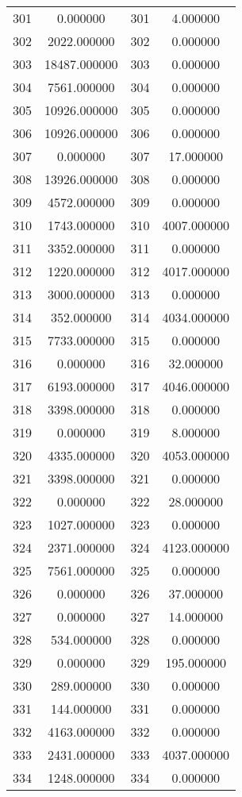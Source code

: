 \documentclass[12pt]{article}
\begin{document}
\begin{longtable}{@{}cccc@{}}
301 & 0.000000 & 301 & 4.000000 \\
302 & 2022.000000 & 302 & 0.000000 \\
303 & 18487.000000 & 303 & 0.000000 \\
304 & 7561.000000 & 304 & 0.000000 \\
305 & 10926.000000 & 305 & 0.000000 \\
306 & 10926.000000 & 306 & 0.000000 \\
307 & 0.000000 & 307 & 17.000000 \\
308 & 13926.000000 & 308 & 0.000000 \\
309 & 4572.000000 & 309 & 0.000000 \\
310 & 1743.000000 & 310 & 4007.000000 \\
311 & 3352.000000 & 311 & 0.000000 \\
312 & 1220.000000 & 312 & 4017.000000 \\
313 & 3000.000000 & 313 & 0.000000 \\
314 & 352.000000 & 314 & 4034.000000 \\
315 & 7733.000000 & 315 & 0.000000 \\
316 & 0.000000 & 316 & 32.000000 \\
317 & 6193.000000 & 317 & 4046.000000 \\
318 & 3398.000000 & 318 & 0.000000 \\
319 & 0.000000 & 319 & 8.000000 \\
320 & 4335.000000 & 320 & 4053.000000 \\
321 & 3398.000000 & 321 & 0.000000 \\
322 & 0.000000 & 322 & 28.000000 \\
323 & 1027.000000 & 323 & 0.000000 \\
324 & 2371.000000 & 324 & 4123.000000 \\
325 & 7561.000000 & 325 & 0.000000 \\
326 & 0.000000 & 326 & 37.000000 \\
327 & 0.000000 & 327 & 14.000000 \\
328 & 534.000000 & 328 & 0.000000 \\
329 & 0.000000 & 329 & 195.000000 \\
330 & 289.000000 & 330 & 0.000000 \\
331 & 144.000000 & 331 & 0.000000 \\
332 & 4163.000000 & 332 & 0.000000 \\
333 & 2431.000000 & 333 & 4037.000000 \\
334 & 1248.000000 & 334 & 0.000000 \\

\end{longtable}
\end{document}
